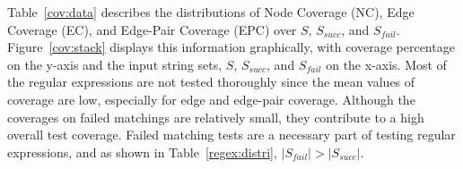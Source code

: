 
Table~\ref{cov:data} describes the distributions of Node Coverage (NC), Edge Coverage (EC), and Edge-Pair Coverage (EPC) over $S$, $S_{succ}$, and $S_{fail}$. Figure~\ref{cov:stack} displays this information graphically, with coverage percentage on the y-axis and the input string sets, $S$, $S_{succ}$, and $S_{fail}$ on the x-axis. 
Most of the regular expressions are not tested thoroughly since the mean values of coverage are low, especially for edge and edge-pair coverage. 
Although the coverages on failed matchings are relatively small, they contribute to a high overall test coverage. Failed matching tests are a necessary part of testing regular expressions, and as shown in Table~\ref{regex:distri}, $\lvert S_{fail} \rvert > \lvert S_{succ} \rvert$.%



